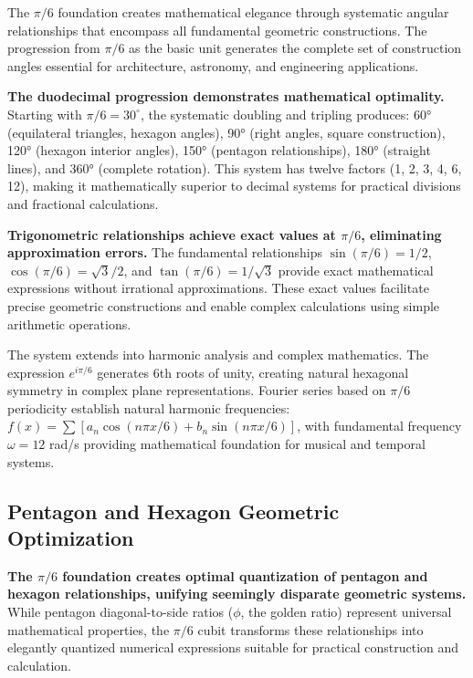 \documentclass[11pt]{article}
\begin{document}
The $\pi/6$ foundation creates mathematical elegance through systematic angular relationships that encompass all fundamental geometric constructions. The progression from $\pi/6$ as the basic unit generates the complete set of construction angles essential for architecture, astronomy, and engineering applications.

\textbf{The duodecimal progression demonstrates mathematical optimality.} Starting with $\pi/6 = 30^\circ$, the systematic doubling and tripling produces: 60° (equilateral triangles, hexagon angles), 90° (right angles, square construction), 120° (hexagon interior angles), 150° (pentagon relationships), 180° (straight lines), and 360° (complete rotation). This system has twelve factors (1, 2, 3, 4, 6, 12), making it mathematically superior to decimal systems for practical divisions and fractional calculations.

\textbf{Trigonometric relationships achieve exact values at $\pi/6$, eliminating approximation errors.} The fundamental relationships $\sin(\pi/6) = 1/2$, $\cos(\pi/6) = \sqrt{3}/2$, and $\tan(\pi/6) = 1/\sqrt{3}$ provide exact mathematical expressions without irrational approximations. These exact values facilitate precise geometric constructions and enable complex calculations using simple arithmetic operations.

The system extends into harmonic analysis and complex mathematics. The expression $e^{i\pi/6}$ generates 6th roots of unity, creating natural hexagonal symmetry in complex plane representations. Fourier series based on $\pi/6$ periodicity establish natural harmonic frequencies: $f(x) = \sum[a_n\cos(n\pi x/6) + b_n\sin(n\pi x/6)]$, with fundamental frequency $\omega = 12$ rad/s providing mathematical foundation for musical and temporal systems.

\subsection{Pentagon and Hexagon Geometric Optimization}



\textbf{The $\pi/6$ foundation creates optimal quantization of pentagon and hexagon relationships, unifying seemingly disparate geometric systems.} While pentagon diagonal-to-side ratios ($\phi$, the golden ratio) represent universal mathematical properties, the $\pi/6$ cubit transforms these relationships into elegantly quantized numerical expressions suitable for practical construction and calculation.
\end{document}
